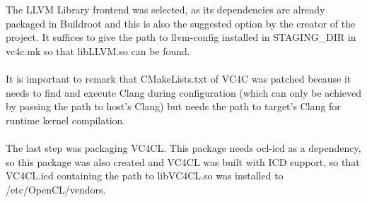 \documentclass[12pt,a4paper,oneside]{article}
\begin{document}
The LLVM Library frontend was selected, as its dependencies are already packaged
in Buildroot and this is also the suggested option by the creator of the project.
It suffices to give the path to llvm-config installed in STAGING\_DIR in vc4c.mk
so that libLLVM.so can be found.\\\\
It is important to remark that CMakeLists.txt of VC4C was patched because it
needs to find and execute Clang during configuration (which can only be achieved
by passing the path to host's Clang) but needs the path to target's Clang for
runtime kernel compilation.\\\\
The last step was packaging VC4CL. This package needs ocl-icd as a dependency, so
this package was also created and VC4CL was built with ICD support, so that VC4CL.icd
containing the path to libVC4CL.so was installed to /etc/OpenCL/vendors.
\end{document}
